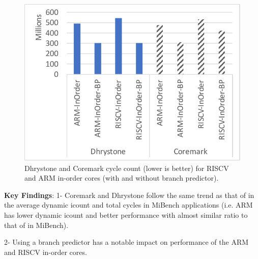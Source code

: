 \begin{figure}[]
	\centering
	\includegraphics[width=1\columnwidth]{figures/coremark.pdf}
	\caption{Dhrystone and Coremark cycle count (lower is better) for RISCV and ARM in-order cores (with and without branch predictor).}
	\label{fig:coreperf}
	\vspace{-1em}
\end{figure} 

\noindent \textbf{Key Findings}: 1- Coremark and Dhrystone follow the same trend as that of in the average dynamic icount and total cycles in MiBench applications (i.e. ARM has lower dynamic icount and better performance with almost similar ratio to that of in MiBench). 

2- Using a branch predictor has a notable impact on performance of the ARM and RISCV in-order cores. 










